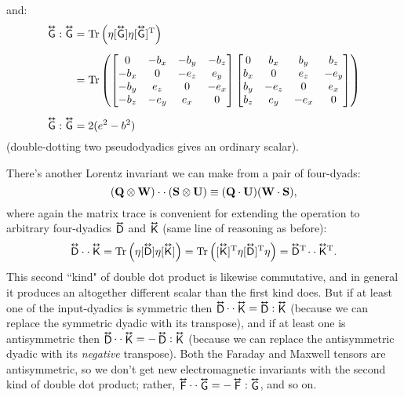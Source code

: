 \documentclass[12pt]{article}
\renewcommand{\vv}[1]{\mathbf{#1}}
\newcommand{\tightoverset}[2]{%
  \mathop{#2}\limits^{\vbox to -.5ex{\kern-0.75ex\hbox{$#1$}\vss}}}
\newcommand{\inlinedy}[1]{\tightoverset{\text{\tiny$\bm\leftrightarrow$}}{#1}}
\newcommand{\capdy}[1]{ \overset{ \text{\tiny$\bm\leftrightarrow$} }{\vphantom{\text{\small{A}}}\smash{#1}} }
\begin{document}
and:
\begin{equation}\label{eq:gddg}
\begin{split}
\capdy{\mathsf{G}} : \capdy{\mathsf{G}} &= \mathrm{Tr} \left( \eta [ \capdy{\mathsf{G}} ] \eta [ \capdy{\mathsf{G}} ]^{\mathrm{T}} \right) \\[5pt]
&=
\mathrm{Tr}
\left(
\begin{bmatrix}
0 & -b_x & -b_y & -b_z \\
-b_x & 0 & -e_z & e_y \\
-b_y & e_z & 0 & -e_x \\
-b_z & -e_y & e_x & 0
\end{bmatrix}
\begin{bmatrix}
0 & b_x & b_y & b_z \\
b_x & 0 & e_z & -e_y \\
b_y & -e_z & 0 & e_x \\
b_z & e_y & -e_x & 0
\end{bmatrix}
\right) \\[5pt]
\capdy{\mathsf{G}} : \capdy{\mathsf{G}} &= 2 (e^2 - b^2)
\end{split}
\end{equation}
(double-dotting two pseudodyadics gives an ordinary scalar).

There's another Lorentz invariant we can make from a pair of four-dyads:
\begin{equation*}
(\vv Q \otimes \vv W) \cdot \cdot \, \mkern1mu (\vv S \otimes \vv U) \equiv (\vv Q \cdot \vv U) (\vv W \cdot \vv S) ,
\end{equation*}
where again the matrix trace is convenient for extending the operation to arbitrary four-dyadics $\inlinedy{\mathsf{D}}$ and $\inlinedy{\mathsf{K}}$ (same line of reasoning as before):
\begin{equation*}
\capdy{\mathsf{D}} \cdot \cdot \, \mkern1mu \capdy{\mathsf{K}} = \mathrm{Tr} \left( \eta [\capdy{\mathsf{D}}] \eta [ \capdy{\mathsf{K}} ] \right) = \mathrm{Tr} \left( [ \capdy{\mathsf{K}} ]^\mathrm{T} \eta [\capdy{\mathsf{D}}]^\mathrm{T} \eta \right) = \capdy{\mathsf{D}} \mkern0mu ^\mathrm{T} \mkern-2mu \cdot \cdot \, \mkern1mu \capdy{\mathsf{K}} \mkern0mu ^\mathrm{T} .
\end{equation*}
This second ``kind" of double dot product is likewise commutative, and in general it produces an altogether different scalar than the first kind does. But if at least one of the input-dyadics is symmetric then $\inlinedy{\mathsf{D}}  \cdot \cdot \inlinedy{\mathsf{K}} = \inlinedy{\mathsf{D}} : \inlinedy{\mathsf{K}}$ (because we can replace the symmetric dyadic with its transpose), and if at least one is antisymmetric then $\inlinedy{\mathsf{D}}  \cdot \cdot \inlinedy{\mathsf{K}} = - \inlinedy{\mathsf{D}} : \inlinedy{\mathsf{K}}$ (because we can replace the antisymmetric dyadic with its \emph{negative} transpose). Both the Faraday and Maxwell tensors are antisymmetric, so we don't get new electromagnetic invariants with the second kind of double dot product; rather, ${\inlinedy{\mathsf{F}}  \cdot \cdot \inlinedy{\mathsf{G}} = - \inlinedy{\mathsf{F}} : \inlinedy{\mathsf{G}}}$, and so on. 
\end{document}
